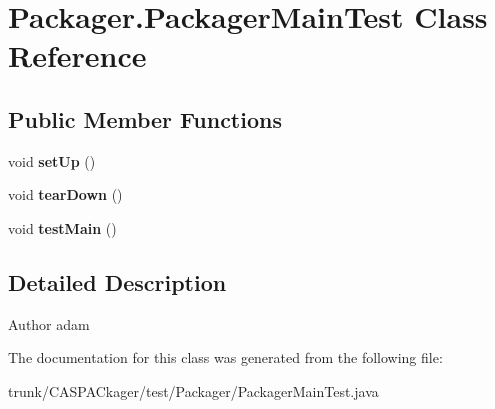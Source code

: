 \hypertarget{class_packager_1_1_packager_main_test}{\section{Packager.\-Packager\-Main\-Test Class Reference}
\label{class_packager_1_1_packager_main_test}
}
\subsection*{Public Member Functions}
\begin{DoxyCompactItemize}
\item 
\hypertarget{class_packager_1_1_packager_main_test_af8578d165f81c09371983443aa8d0155}{void {\bfseries set\-Up} ()}\label{class_packager_1_1_packager_main_test_af8578d165f81c09371983443aa8d0155}

\item 
\hypertarget{class_packager_1_1_packager_main_test_ae425a28b4b0e0852f417d36f88bb859f}{void {\bfseries tear\-Down} ()}\label{class_packager_1_1_packager_main_test_ae425a28b4b0e0852f417d36f88bb859f}

\item 
\hypertarget{class_packager_1_1_packager_main_test_a6c024845bdb339b04c99b75be6f3a6d7}{void {\bfseries test\-Main} ()}\label{class_packager_1_1_packager_main_test_a6c024845bdb339b04c99b75be6f3a6d7}

\end{DoxyCompactItemize}


\subsection{Detailed Description}
\begin{DoxyAuthor}{Author}
adam 
\end{DoxyAuthor}


The documentation for this class was generated from the following file\-:\begin{DoxyCompactItemize}
\item 
trunk/\-C\-A\-S\-P\-A\-Ckager/test/\-Packager/Packager\-Main\-Test.\-java\end{DoxyCompactItemize}
